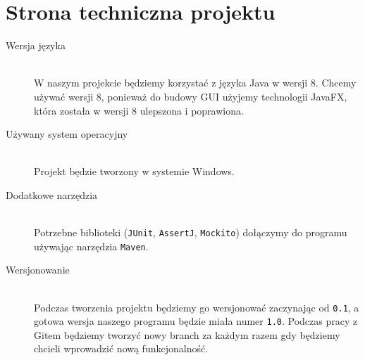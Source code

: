 \documentclass[a4paper,11pt, notitlepage ]{article}
\begin{document}
\section{Strona techniczna projektu}
\begin{description}
\item[Wersja języka] \hfill \\
W naszym projekcie będziemy korzystać z języka Java w wersji 8. Chcemy używać wersji 8, ponieważ do budowy GUI użyjemy technologii JavaFX, która została w wersji 8 ulepszona i poprawiona.
\item[Używany system operacyjny]\hfill \\
 Projekt będzie tworzony w systemie Windows.
\item[Dodatkowe narzędzia]\hfill \\
Potrzebne biblioteki (\verb+JUnit+, \verb+AssertJ+, \verb+Mockito+) dołączymy do programu używając narzędzia \verb+Maven+.
\item[Wersjonowanie]\hfill \\
Podczas tworzenia projektu będziemy go wersjonować zaczynając od \verb+0.1+, a gotowa wersja naszego programu będzie miała numer \verb+1.0+. Podczas pracy z Gitem będziemy tworzyć nowy branch za każdym razem gdy będziemy chcieli wprowadzić nową funkcjonalność.
\end{description}
\end{document}
